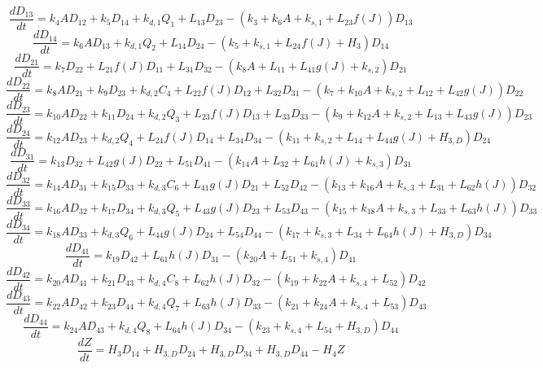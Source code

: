 \[\dfrac{dD_{13}}{dt}=k_{4}AD_{12}+k_{5}D_{14}+k_{d,1}Q_{1}+L_{13}D_{23}-\left(k_{3}+k_{6}A+k_{s,1}+L_{23}f\left(J\right)\right)D_{13}\]
\[\dfrac{dD_{14}}{dt}=k_{6}AD_{13}+k_{d,1}Q_{2}+L_{14}D_{24}-\left(k_{5}+k_{s,1}+L_{24}f\left(J\right)+H_{3}\right)D_{14}\]
\[\dfrac{dD_{21}}{dt}=k_{7}D_{22}+L_{21}f\left(J\right)D_{11}+L_{31}D_{32}-\left(k_{8}A+L_{11}+L_{41}g\left(J\right)+k_{s,2}\right)D_{21}\]
\[\dfrac{dD_{22}}{dt}=k_{8}AD_{21}+k_{9}D_{23}+k_{d,2}C_{4}+L_{22}f\left(J\right)D_{12}+L_{32}D_{31}-\left(k_{7}+k_{10}A+k_{s,2}+L_{12}+L_{42}g\left(J\right)\right)D_{22}\]
\[\dfrac{dD_{23}}{dt}=k_{10}AD_{22}+k_{11}D_{24}+k_{d,2}Q_{3}+L_{23}f\left(J\right)D_{13}+L_{33}D_{33}-\left(k_{9}+k_{12}A+k_{s,2}+L_{13}+L_{43}g\left(J\right)\right)D_{23}\]
\[\dfrac{dD_{24}}{dt}=k_{12}AD_{23}+k_{d,2}Q_{4}+L_{24}f\left(J\right)D_{14}+L_{34}D_{34}-\left(k_{11}+k_{s,2}+L_{14}+L_{44}g\left(J\right)+H_{3,D}\right)D_{24}\]
\[\dfrac{dD_{31}}{dt}=k_{13}D_{32}+L_{42}g\left(J\right)D_{22}+L_{51}D_{41}-\left(k_{14}A+L_{32}+L_{61}h\left(J\right)+k_{s,3}\right)D_{31}\]
\[\dfrac{dD_{32}}{dt}=k_{14}AD_{31}+k_{15}D_{33}+k_{d,3}C_{6}+L_{41}g\left(J\right)D_{21}+L_{52}D_{42}-\left(k_{13}+k_{16}A+k_{s,3}+L_{31}+L_{62}h\left(J\right)\right)D_{32}\]
\[\dfrac{dD_{33}}{dt}=k_{16}AD_{32}+k_{17}D_{34}+k_{d,3}Q_{5}+L_{43}g\left(J\right)D_{23}+L_{53}D_{43}-\left(k_{15}+k_{18}A+k_{s,3}+L_{33}+L_{63}h\left(J\right)\right)D_{33}\]
\[\dfrac{dD_{34}}{dt}=k_{18}AD_{33}+k_{d,3}Q_{6}+L_{44}g\left(J\right)D_{24}+L_{54}D_{44}-\left(k_{17}+k_{s,3}+L_{34}+L_{64}h\left(J\right)+H_{3,D}\right)D_{34}\]
\[\dfrac{dD_{41}}{dt}=k_{19}D_{42}+L_{61}h\left(J\right)D_{31}-\left(k_{20}A+L_{51}+k_{s,4}\right)D_{41}\]
\[\dfrac{dD_{42}}{dt}=k_{20}AD_{41}+k_{21}D_{43}+k_{d,4}C_{8}+L_{62}h\left(J\right)D_{32}-\left(k_{19}+k_{22}A+k_{s,4}+L_{52}\right)D_{42}\]
\[\dfrac{dD_{43}}{dt}=k_{22}AD_{42}+k_{23}D_{44}+k_{d,4}Q_{7}+L_{63}h\left(J\right)D_{33}-\left(k_{21}+k_{24}A+k_{s,4}+L_{53}\right)D_{43}\]
\[\dfrac{dD_{44}}{dt}=k_{24}AD_{43}+k_{d,4}Q_{8}+L_{64}h\left(J\right)D_{34}-\left(k_{23}+k_{s,4}+L_{54}+H_{3,D}\right)D_{44}\]
\[\dfrac{dZ}{dt}=H_{3}D_{14}+H_{3,D}D_{24}+H_{3,D}D_{34}+H_{3,D}D_{44}-H_{4}Z\]
